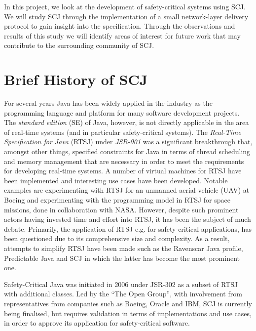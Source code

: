 In this project, we look at the development of safety-critical systems using SCJ. We will study SCJ through the implementation of a small network-layer delivery protocol to gain insight into the specification. Through the observations and results of this study we will identify areas of interest for future work that may contribute to the surrounding community of SCJ.

\section{Brief History of SCJ} %
\label{sub:brief_history_of_java_for_safety_critical_systems}
For several years Java has been widely applied in the industry as the programming language and platform for many software development projects. The \textit{standard edition} (SE) of Java, however, is not directly applicable in the area of real-time systems (and in particular safety-critical systems). The \textit{Real-Time Specification for Java} (RTSJ) under \textit{JSR-001}\cite{alan2001real, henties:2009-20} was a significant breakthrough that, amongst other things, specified constraints for Java in terms of thread scheduling and memory management that are necessary in order to meet the requirements for developing real-time systems. A number of virtual machines for RTSJ have been implemented and interesting use cases have been developed. Notable examples are experimenting with RTSJ for an unmanned aerial vehicle (UAV) at Boeing\cite{Armbruster:2007:RJV:1324969.1324974} and experimenting with the programming model in RTSJ for space missions, done in collaboration with NASA\cite{DBLP:conf/isorc/DvorakBCCCGIMMR04}. However, despite such prominent actors having invested time and effort into RTSJ, it has been the subject of much debate. Primarily, the application of RTSJ e.g. for safety-critical applications, has been questioned due to its comprehensive size and complexity. As a result, attempts to simplify RTSJ have been made such as the Ravenscar Java profile\cite{Kwon:2002:RHI:583810.583825}, Predictable Java\cite{Bogholm:2009:PJP:1620405.1620427} and SCJ in which the latter has become the most prominent one.

Safety-Critical Java was initiated in 2006 under JSR-302 as a subset of RTSJ with additional classes\cite{Schoeberl:2012:SCJonJava}. Led by the ``The Open Group'', with involvement from representatives from companies such as Boeing, Oracle and IBM, SCJ is currently being finalised, but requires validation in terms of implementations and use cases, in order to approve its application for safety-critical software.

